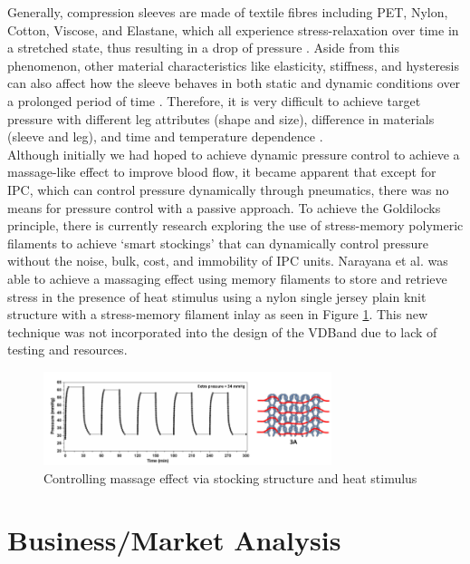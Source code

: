 \documentclass[11.5pt]{article}
\begin{document}
Generally, compression sleeves are made of textile fibres including PET, Nylon, Cotton, Viscose, and Elastane, which all experience stress-relaxation over time in a stretched state, thus resulting in a drop of pressure \cite{Narayana}. Aside from this phenomenon, other material characteristics like elasticity, stiffness, and hysteresis can also affect how the sleeve behaves in both static and dynamic conditions over a prolonged period of time \cite{Narayana}. Therefore, it is very difficult to achieve target pressure with different leg attributes (shape and size), difference in materials (sleeve and leg), and time and temperature dependence \cite{Narayana}.\\

Although initially we had hoped to achieve dynamic pressure control to achieve a massage-like effect to improve blood flow, it became apparent that except for IPC, which can control pressure dynamically through pneumatics, there was no means for pressure control with a passive approach. To achieve the Goldilocks principle, there is currently research exploring the use of stress-memory polymeric filaments to achieve `smart stockings' that can dynamically control pressure without the noise, bulk, cost, and immobility of IPC units. Narayana et al. was able to achieve a massaging effect using memory filaments to store and retrieve stress in the presence of heat stimulus using a nylon single jersey plain knit structure with a stress-memory filament inlay as seen in Figure \ref{fig:stressmem}. This new technique was not incorporated into the design of the VDBand due to lack of testing and resources.

\begin{figure}[H]
    \centering
    \includegraphics[width=0.75\textwidth]{litreview/stressmem2.PNG}
    \caption{Controlling massage effect via stocking structure and heat stimulus \cite{Narayana}}
    \label{fig:stressmem}
\end{figure}

\section{Business/Market Analysis}
\end{document}
